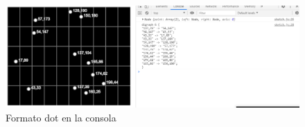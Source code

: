 \begin{figure}[H]
  \centering
  \includegraphics[width=1.1\textwidth]{images/cuatro.PNG}
  \caption{Formato dot en la consola}
  \label{fig:act-4}
\end{figure}
